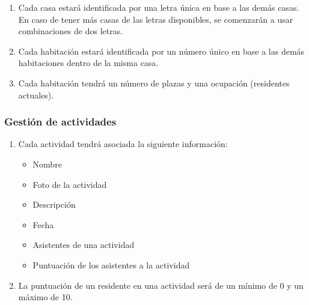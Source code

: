 \begin{enumerate}[start=15,label={RNF-\arabic*.}]

    \item Cada casa estará identificada por una letra única en base a las demás casas. En caso de tener más casas de las letras disponibles, se comenzarán a usar combinaciones de dos letras.
    \item Cada habitación estará identificada por un número único en base a las demás habitaciones dentro de la misma casa.
    \item Cada habitación tendrá un número de plazas y una ocupación (residentes actuales).

\end{enumerate}

\subsubsection{Gestión de actividades}

\begin{enumerate}[start=18,label={RNF-\arabic*.}]

    \item Cada actividad tendrá asociada la siguiente información:
        \begin{itemize}
            \item Nombre
            \item Foto de la actividad
            \item Descripción
            \item Fecha
            \item Asistentes de una actividad
            \item Puntuación de los asistentes a la actividad
        \end{itemize}
    \item La puntuación de un residente en una actividad será de un mínimo de 0 y un máximo de 10.

\end{enumerate}